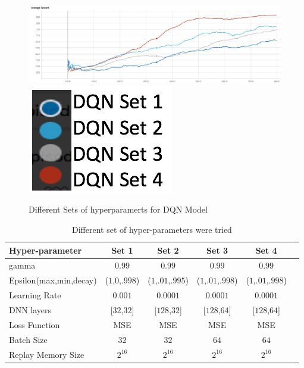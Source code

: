 \begin{figure}[!ht]
\includegraphics[scale=0.75,width=0.75\columnwidth]{figures/Hyperparameters1.png}%
\includegraphics[scale=0.15,width=0.15\columnwidth]{figures/Hyperparameters_legends1.png}%
\caption{ Different Sets of hyperparamerts for DQN Model}%
\label{fig:HyperParameter Table}%
\end{figure}


\label{sec:exp1}
\begin{table}%
\begin{tabular}{|l|c|c|c|c|c|}
\hline
Hyper-parameter & Set 1  & Set 2 & Set 3 & Set 4  \\
\hline
gamma & $0.99$ & $0.99$ & $0.99$ & $0.99$ \\
\hline
Epsilon(max,min,decay) & ($1$,$0$,$.998$) &  ($1$,$.01$,$.995$) &  ($1$,$.01$,$.998$) &  ($1$,$.01$,$.998$) \\
\hline
Learning Rate & $0.001$ & $0.0001$ & $0.0001$ & $0.0001$ \\
\hline
DNN layers & [$32$,$32$] &  [$128$,$32$] &  [$128$,$64$] &  [$128$,$64$] \\
\hline
Loss Function & MSE & MSE & MSE & MSE \\
\hline
Batch Size & $32$ & $32$  & $64$  & $64$  \\
\hline
Replay Memory Size & $2^{16}$ & $2^{16}$  & $2^{16}$  & $2^{16}$  \\
\hline
\end{tabular}
\caption{Different set of hyper-parameters were tried}
\label{tab:Hyper Parameter Set table}
\end{table}
